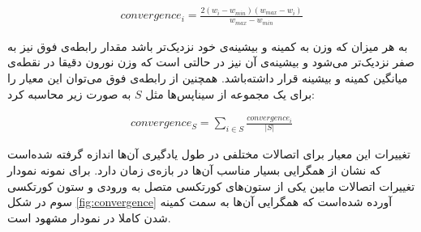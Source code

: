 \documentclass[12pt]{report}
\begin{document}
	\begin{align}
		convergence_i = \frac{2 (w_i - w_{min})(w_{max} - w_i) }{ w_{max} - w_{min} }
		\label{eq:convergence_single}
	\end{align}

	به هر میزان که وزن به کمینه و بیشینه‌ی خود نزدیک‌تر باشد مقدار رابطه‌ی فوق نیز به صفر نزدیک‌تر می‌شود و بیشینه‌ی آن نیز در حالتی است که وزن نورون دقیقا در نقطه‌ی میانگین کمینه و بیشینه قرار داشته‌باشد. همچنین از رابطه‌ی فوق می‌توان این معیار را برای یک مجموعه از سیناپس‌ها مثل $S$ به صورت زیر محاسبه کرد:
	
	\begin{align}
		convergence_{S} = \sum_{i \in S} \frac{convergence_i}{|S|} 
		\label{eq:convergence_pop}
	\end{align}
	
	تغییرات این معیار برای اتصالات مختلفی در طول یادگیری آن‌ها اندازه گرفته‌ شده‌است که نشان از همگرایی بسیار مناسب آن‌ها در بازه‌ی زمان دارد. برای نمونه نمودار تغییرات اتصالات مابین یکی از ستون‌های کورتکسی متصل به ورودی و ستون کورتکسی سوم در شکل \ref{fig:convergence} آورده شده‌است که همگرایی آن‌ها به سمت کمینه شدن کاملا در نمودار مشهود است.
	
\end{document}
